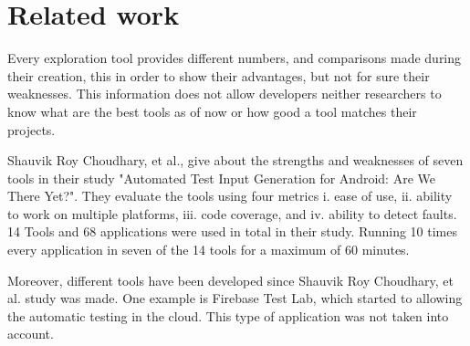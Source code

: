 
\chapter{Related work} %


\label{Chapter3} %


Every exploration tool provides different numbers, and comparisons made during their creation, this in order to show their advantages, but not for sure their weaknesses. This information does not allow developers neither researchers to know what are the best tools as of now or how good a tool matches their projects. 

Shauvik Roy Choudhary, et al., give about the strengths and weaknesses of seven tools in their study "Automated Test Input Generation for Android:
Are We There Yet?". They evaluate the tools using four metrics i. ease
of use, ii. ability to work on multiple platforms, iii. code coverage, and iv.
ability to detect faults. 14 Tools and 68 applications were used in total in their study. Running 10 times every application in seven of the 14 tools for a maximum of 60 minutes.

Moreover, different tools have been developed since Shauvik Roy Choudhary, et al. study was made. One example is Firebase Test Lab, which started to allowing the automatic testing in the cloud. This type of application was not taken into account.
